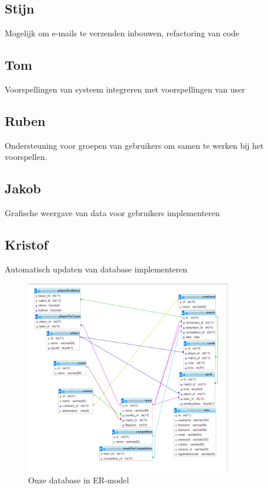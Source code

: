 \documentclass[11pt, a4paper]{article}
\begin{document}
\subsection{Stijn}
Mogelijk om e-mails te verzenden inbouwen, refactoring van code
\subsection{Tom}
Voorspellingen van systeem integreren met voorspellingen van user
\subsection{Ruben}
Ondersteuning voor groepen van gebruikers om samen te werken bij het voorspellen.
\subsection{Jakob}
Grafische weergave van data voor gebruikers implementeren
\subsection{Kristof}
Automatisch updaten van database implementeren



\begin{figure}[ht!]
\centering
\includegraphics[width=90mm]{ER.png}
\caption{Onze database in ER-model}
\label{overflow}
\end{figure}
\end{document}
